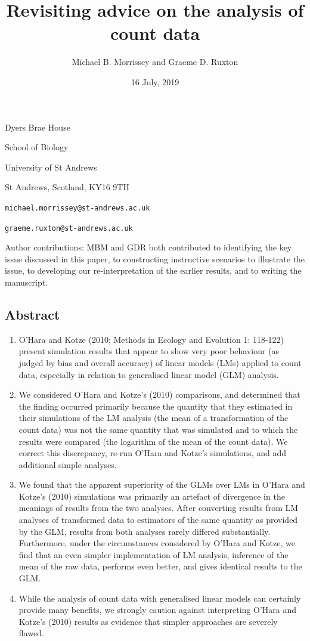 \documentclass[]{article}
\title{Revisiting advice on the analysis of count data}
\author{Michael B. Morrissey and Graeme D. Ruxton}
\date{16 July, 2019}
\begin{document}
\maketitle

Dyers Brae House

School of Biology

University of St Andrews

St Andrews, Scotland, KY16 9TH

\texttt{michael.morrissey@st-andrews.ac.uk}

\texttt{graeme.ruxton@st-andrews.ac.uk}

Author contributions: MBM and GDR both contributed to identifying the
key issue discussed in this paper, to constructing instructive scenarios
to illustrate the issue, to developing our re-interpretation of the
earlier results, and to writing the manuscript.

\clearpage

\subsection{Abstract}\label{abstract}

\begin{enumerate}
\def\labelenumi{(\arabic{enumi})}
\item
  O'Hara and Kotze (2010; Methods in Ecology and Evolution 1: 118-122)
  present simulation results that appear to show very poor behaviour (as
  judged by bias and overall accuracy) of linear models (LMs) applied to
  count data, especially in relation to generalised linear model (GLM)
  analysis.
\item
  We considered O'Hara and Kotze's (2010) comparisons, and determined
  that the finding occurred primarily because the quantity that they
  estimated in their simulations of the LM analysis (the mean of a
  transformation of the count data) was not the same quantity that was
  simulated and to which the results were compared (the logarithm of the
  mean of the count data). We correct this discrepancy, re-run O'Hara
  and Kotze's simulations, and add additional simple analyses.
\item
  We found that the apparent superiority of the GLMs over LMs in O'Hara
  and Kotze's (2010) simulations was primarily an artefact of divergence
  in the meanings of results from the two analyses. After converting
  results from LM analyses of transformed data to estimators of the same
  quantity as provided by the GLM, results from both analyses rarely
  differed substantially. Furthermore, under the circumstances
  considered by O'Hara and Kotze, we find that an even simpler
  implementation of LM analysis, inference of the mean of the raw data,
  performs even better, and gives identical results to the GLM.
\item
  While the analysis of count data with generalised linear models can
  certainly provide many benefits, we strongly caution against
  interpreting O'Hara and Kotze's (2010) results as evidence that
  simpler approaches are severely flawed.
\end{enumerate}
\end{document}
